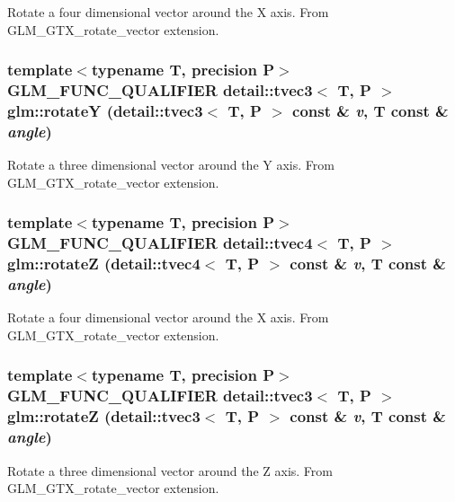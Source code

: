 Rotate a four dimensional vector around the X axis. From GLM\_\-GTX\_\-rotate\_\-vector extension. \hypertarget{group__gtx__rotate__vector_g8e792cb7fbd2ad57a4eafcccc62c523c}{
\subsubsection[rotateY]{\setlength{\rightskip}{0pt plus 5cm}template$<$typename T, precision P$>$ GLM\_\-FUNC\_\-QUALIFIER detail::tvec3$<$ T, P $>$ glm::rotateY (detail::tvec3$<$ T, P $>$ const \& {\em v}, \/  T const \& {\em angle})}}
\label{group__gtx__rotate__vector_g8e792cb7fbd2ad57a4eafcccc62c523c}


Rotate a three dimensional vector around the Y axis. From GLM\_\-GTX\_\-rotate\_\-vector extension. \hypertarget{group__gtx__rotate__vector_g4505b3c64cf26afba934ad1f65c5f792}{
\subsubsection[rotateZ]{\setlength{\rightskip}{0pt plus 5cm}template$<$typename T, precision P$>$ GLM\_\-FUNC\_\-QUALIFIER detail::tvec4$<$ T, P $>$ glm::rotateZ (detail::tvec4$<$ T, P $>$ const \& {\em v}, \/  T const \& {\em angle})}}
\label{group__gtx__rotate__vector_g4505b3c64cf26afba934ad1f65c5f792}


Rotate a four dimensional vector around the X axis. From GLM\_\-GTX\_\-rotate\_\-vector extension. \hypertarget{group__gtx__rotate__vector_g67b56c3da73e7da777810b2a82bab4f8}{
\subsubsection[rotateZ]{\setlength{\rightskip}{0pt plus 5cm}template$<$typename T, precision P$>$ GLM\_\-FUNC\_\-QUALIFIER detail::tvec3$<$ T, P $>$ glm::rotateZ (detail::tvec3$<$ T, P $>$ const \& {\em v}, \/  T const \& {\em angle})}}
\label{group__gtx__rotate__vector_g67b56c3da73e7da777810b2a82bab4f8}


Rotate a three dimensional vector around the Z axis. From GLM\_\-GTX\_\-rotate\_\-vector extension. 
